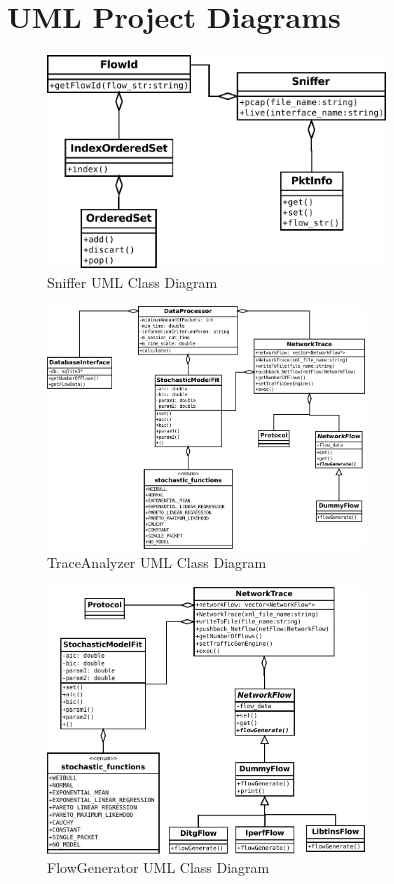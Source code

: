 \chapter{UML Project Diagrams}

\begin{figure}[ht!]
	\centering
	\includegraphics[width=0.8\textwidth]{figures/apD/sniffer}
	\caption{Sniffer UML Class Diagram}
	\label{fig:uml-sniffer}
\end{figure}


\begin{figure}[ht!]
	\centering
	\includegraphics[width=0.75\textwidth]{figures/apD/trace-analyzer}
	\caption{TraceAnalyzer UML Class Diagram}
	\label{fig:uml-trace-analyzer}
\end{figure}


\begin{figure}[ht!]
	\centering
	\includegraphics[width=0.75\textwidth]{figures/apD/flow-generator}
	\caption{FlowGenerator UML Class Diagram}
	\label{fig:uml-flow-generator}
\end{figure}

